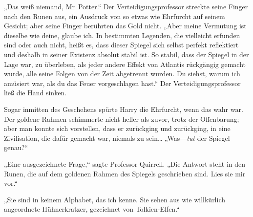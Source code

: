 „Das weiß niemand, Mr~Potter.“ Der Verteidigungsprofessor streckte seine Finger nach den Runen aus, ein Ausdruck von so etwas wie Ehrfurcht auf seinem Gesicht; aber seine Finger berührten das Gold nicht. „Aber meine Vermutung ist dieselbe wie deine, glaube ich. In bestimmten Legenden, die vielleicht erfunden sind oder auch nicht, heißt es, dass dieser Spiegel sich selbst perfekt reflektiert und deshalb in seiner Existenz absolut stabil ist. So stabil, dass der Spiegel in der Lage war, zu überleben, als jeder andere Effekt von Atlantis rückgängig gemacht wurde, alle seine Folgen von der Zeit abgetrennt wurden. Du siehst, warum ich amüsiert war, als du das Feuer vorgeschlagen hast.“
Der Verteidigungsprofessor ließ die Hand sinken.

Sogar inmitten des Geschehens spürte Harry die Ehrfurcht, wenn das wahr war. Der goldene Rahmen schimmerte nicht heller als zuvor, trotz der Offenbarung; aber man konnte sich vorstellen, dass er zurückging und zurückging, in eine Zivilisation, die dafür gemacht war, niemals zu sein…
„Was—\emph{tut} der Spiegel genau?“

„Eine ausgezeichnete Frage,“ sagte Professor Quirrell. „Die Antwort steht in den Runen, die auf dem goldenen Rahmen des Spiegels geschrieben sind. Lies sie mir vor.“

„Sie sind in keinem Alphabet, das ich kenne. Sie sehen aus wie willkürlich angeordnete Hühnerkratzer, gezeichnet von Tolkien-Elfen.“

